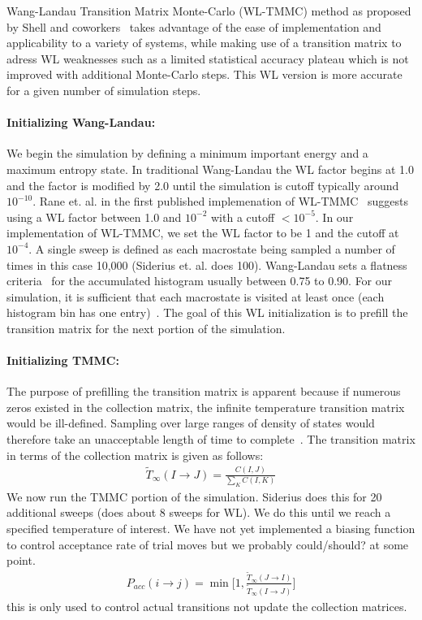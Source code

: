 \documentclass[letterpaper,twocolumn,amsmath,amssymb,pre,aps,10pt]{revtex4-1}
\begin{document}
Wang-Landau Transition Matrix Monte-Carlo (WL-TMMC) method as proposed 
by Shell and coworkers~\cite{shell2003improved,shell2004flat} takes 
advantage of the ease of implementation and applicability to a variety 
of systems, while making use of a transition matrix to adress WL 
weaknesses such as a limited statistical accuracy plateau which is not 
improved with additional Monte-Carlo steps.  This WL version is more 
accurate for a given number of simulation steps.

\paragraph{Initializing Wang-Landau:} We begin the simulation by 
defining a minimum important energy and a maximum entropy state. In 
traditional Wang-Landau the WL factor begins at 1.0 and the factor is 
modified by 2.0 until the simulation is cutoff typically around 
$10^{-10}$.  Rane et. al. in the first published implemenation of 
WL-TMMC~\cite{rane2013monte} suggests using a WL factor between 1.0 and 
$10^{-2}$ with a cutoff $<10^{-5}$. In our implementation of WL-TMMC, 
we set the WL factor to be 1 and the cutoff at $10^{-4}$. A single 
sweep is defined as each macrostate being sampled a number of times in 
this case 10,000 (Siderius et. al. does 100). Wang-Landau sets a 
flatness criteria~\cite{wang2001determining, wang2001efficient, 
hatch2015computational, mahynski2017predicting} for the accumulated 
histogram usually between 0.75 to 0.90.  For our simulation, it is 
sufficient that each macrostate is visited at least once (each 
histogram bin has one entry)~\cite{shell2003improved}.  The goal of 
this WL initialization is to prefill the transition matrix for the next 
portion of the simulation. 
\paragraph{Initializing TMMC:} The purpose of prefilling the transition 
matrix is apparent because if numerous zeros existed in the collection 
matrix, the infinite temperature transition matrix would be 
ill-defined.  Sampling over large ranges of density of states would 
therefore take an unacceptable length of time to 
complete~\cite{shell2003improved, shen2014elucidating}.  The transition 
matrix in terms of the collection matrix is given as follows:
\begin{align}
\widetilde{T}_{\infty}(I\rightarrow J) = \frac{C(I,J)}
{\sum_{K} C(I,K)}
\end{align}
We now run the TMMC portion of the simulation.  Siderius does this for
20 additional sweeps (does about 8 sweeps for WL).  We do this until we
reach a specified temperature of interest.
We have not yet implemented a biasing function to control acceptance
rate of trial moves but we probably could/should? at some point.
\begin{align}
  P_{acc}(i\rightarrow j) = \min\bigg[1,\frac{\widetilde{T}_{\infty}(J\rightarrow I)}
  {\widetilde{T}_{\infty}(I\rightarrow J)}\bigg]
\end{align}
this is only used to control actual transitions not update the collection
matrices.
\end{document}
